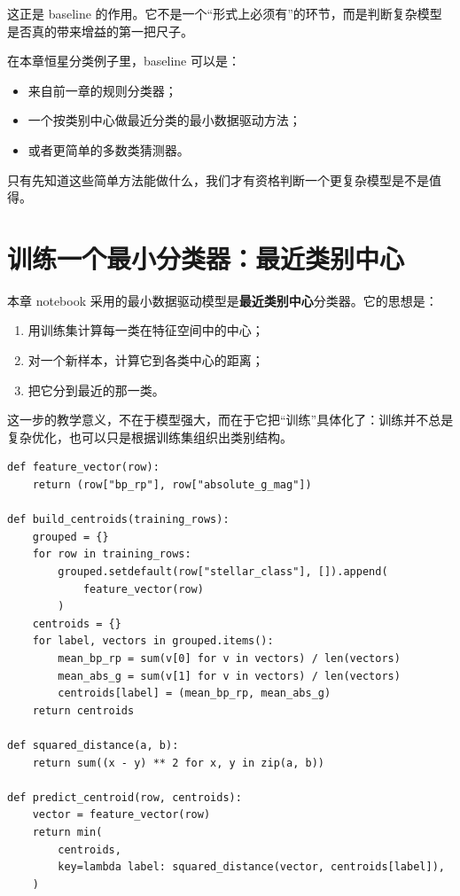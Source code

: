 这正是 baseline 的作用。它不是一个“形式上必须有”的环节，而是判断复杂模型是否真的带来增益的第一把尺子。

在本章恒星分类例子里，baseline 可以是：

\begin{itemize}
    \item 来自前一章的规则分类器；
    \item 一个按类别中心做最近分类的最小数据驱动方法；
    \item 或者更简单的多数类猜测器。
\end{itemize}

只有先知道这些简单方法能做什么，我们才有资格判断一个更复杂模型是不是值得。

\section{训练一个最小分类器：最近类别中心}

本章 notebook 采用的最小数据驱动模型是\textbf{最近类别中心}分类器。它的思想是：

\begin{enumerate}
    \item 用训练集计算每一类在特征空间中的中心；
    \item 对一个新样本，计算它到各类中心的距离；
    \item 把它分到最近的那一类。
\end{enumerate}

这一步的教学意义，不在于模型强大，而在于它把“训练”具体化了：训练并不总是复杂优化，也可以只是根据训练集组织出类别结构。

\begin{examplebox}[构造最小分类器]
\begin{lstlisting}[style=pythonstyle]
def feature_vector(row):
    return (row["bp_rp"], row["absolute_g_mag"])

def build_centroids(training_rows):
    grouped = {}
    for row in training_rows:
        grouped.setdefault(row["stellar_class"], []).append(
            feature_vector(row)
        )
    centroids = {}
    for label, vectors in grouped.items():
        mean_bp_rp = sum(v[0] for v in vectors) / len(vectors)
        mean_abs_g = sum(v[1] for v in vectors) / len(vectors)
        centroids[label] = (mean_bp_rp, mean_abs_g)
    return centroids

def squared_distance(a, b):
    return sum((x - y) ** 2 for x, y in zip(a, b))

def predict_centroid(row, centroids):
    vector = feature_vector(row)
    return min(
        centroids,
        key=lambda label: squared_distance(vector, centroids[label]),
    )
\end{lstlisting}
\end{examplebox}

